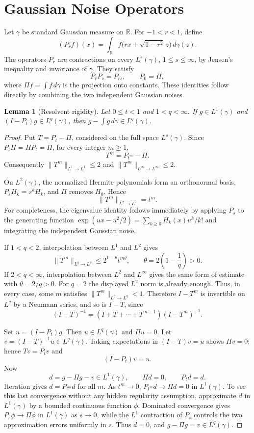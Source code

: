 \documentclass[11pt]{article}
\newtheorem{lemma}{Lemma}
\newcommand{\R}{\mathbb R}
\newcommand{\ga}{\gamma}
\begin{document}
\section*{Gaussian Noise Operators}

Let $\ga$ be standard Gaussian measure on $\R$.  For $-1<r<1$, define
\[
 (P_r f)(x)=\int_{\R}f\bigl(rx+\sqrt{1-r^2}\,z\bigr)\,d\ga(z).
\]
The operators $P_r$ are contractions on every $L^s(\ga)$,
$1\leq s\leq\infty$, by Jensen's inequality and invariance of $\ga$.  They
satisfy
\[
 P_rP_s=P_{rs},\qquad P_0=\Pi,
\]
where $\Pi f=\int f\,d\ga$ is the projection onto constants.  These identities
follow directly by combining the two independent Gaussian noises.

\begin{lemma}[Resolvent rigidity]\label{lem:rigidity}
Let $0\leq t<1$ and $1<q<\infty$.  If $g\in L^1(\ga)$ and
$(I-P_t)g\in L^q(\ga)$, then $g-\int g\,d\ga\in L^q(\ga)$.
\end{lemma}

\begin{proof}
Put $T=P_t-\Pi$, considered on the full space $L^s(\ga)$.  Since
$P_t\Pi=\Pi P_t=\Pi$, for every integer $m\geq1$,
\[
 T^m=P_{t^m}-\Pi.
\]
Consequently $\|T^m\|_{L^1\to L^1}\leq2$ and
$\|T^m\|_{L^\infty\to L^\infty}\leq2$.

On $L^2(\ga)$, the normalized Hermite polynomials form an orthonormal basis,
$P_sH_k=s^kH_k$, and $\Pi$ removes $H_0$.  Hence
\[
 \|T^m\|_{L^2\to L^2}=t^m.
\]
For completeness, the eigenvalue identity follows immediately by applying
$P_s$ to the generating function
$\exp(ux-u^2/2)=\sum_{k\geq0}H_k(x)u^k/k!$ and integrating the independent
Gaussian noise.

If $1<q<2$, interpolation between $L^1$ and $L^2$ gives
\[
 \|T^m\|_{L^q\to L^q}
 \leq 2^{1-\theta}t^{m\theta},
 \qquad \theta=2\left(1-\frac1q\right)>0.
\]
If $2<q<\infty$, interpolation between $L^2$ and $L^\infty$ gives the same
form of estimate with $\theta=2/q>0$.  For $q=2$ the displayed $L^2$ norm is
already enough.  Thus, in every case, some $m$ satisfies
$\|T^m\|_{L^q\to L^q}<1$.  Therefore $I-T^m$ is invertible on $L^q$ by a
Neumann series, and so is $I-T$, since
\[
 (I-T)^{-1}=(I+T+\cdots+T^{m-1})(I-T^m)^{-1}.
\]

Set $u=(I-P_t)g$.  Then $u\in L^q(\ga)$ and $\Pi u=0$.  Let
$v=(I-T)^{-1}u\in L^q(\ga)$.  Taking expectations in $(I-T)v=u$ shows
$\Pi v=0$; hence $Tv=P_tv$ and
\[
 (I-P_t)v=u.
\]
Now
\[
 d=g-\Pi g-v\in L^1(\ga),\qquad \Pi d=0,\qquad P_td=d.
\]
Iteration gives $d=P_{t^m}d$ for all $m$.  As $t^m\to0$,
$P_{t^m}d\to\Pi d=0$ in $L^1(\ga)$.  To see this last convergence without
any hidden regularity assumption, approximate $d$ in $L^1(\ga)$ by a bounded
continuous function $\phi$.  Dominated convergence gives
$P_s\phi\to\Pi\phi$ in $L^1(\ga)$ as $s\to0$, while the $L^1$ contraction
of $P_s$ controls the two approximation errors uniformly in $s$.
Thus $d=0$, and $g-\Pi g=v\in L^q(\ga)$.
\end{proof}
\end{document}
